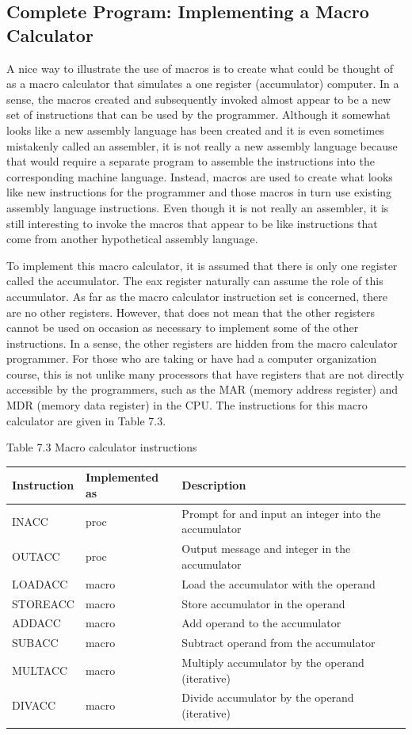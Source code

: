 \documentclass[10pt]{book}
\begin{document}
\subsection{Complete Program: Implementing a Macro Calculator}
A nice way to illustrate the use of macros is to create what could be thought of as a macro calculator that simulates a one register (accumulator) computer. In a sense, the macros created and subsequently invoked almost appear to be a new set of instructions that can be used by the programmer. Although it somewhat looks like a new assembly language has been created and it is even sometimes mistakenly called an assembler, it is not really a new assembly language because that would require a separate program to assemble the instructions into the corresponding machine language. Instead, macros are used to create what looks like new instructions for the programmer and those macros in turn use existing assembly language instructions. Even though it is not really an assembler, it is still interesting to invoke the macros that appear to be like instructions that come from another hypothetical assembly language.

To implement this macro calculator, it is assumed that there is only one register called the accumulator. The eax register naturally can assume the role of this accumulator. As far as the macro calculator instruction set is concerned, there are no other registers. However, that does not mean that the other registers cannot be used on occasion as necessary to implement some of the other instructions. In a sense, the other registers are hidden from the macro calculator programmer. For those who are taking or have had a computer organization course, this is not unlike many processors that have registers that are not directly accessible by the programmers, such as the MAR (memory address register) and MDR (memory data register) in the CPU. The instructions for this macro calculator are given in Table 7.3.

Table 7.3 Macro calculator instructions


\begin{center}
\begin{tabular}{lll|}
\hline
Instruction & Implemented as & Description \\
\hline
INACC & proc & Prompt for and input an integer into the accumulator \\
OUTACC & proc & Output message and integer in the accumulator \\
LOADACC & macro & Load the accumulator with the operand \\
STOREACC & macro & Store accumulator in the operand \\
ADDACC & macro & Add operand to the accumulator \\
SUBACC & macro & Subtract operand from the accumulator \\
MULTACC & macro & Multiply accumulator by the operand (iterative) \\
DIVACC & macro & Divide accumulator by the operand (iterative) \\
 &  &  \\
\end{tabular}
\end{center}
\end{document}

